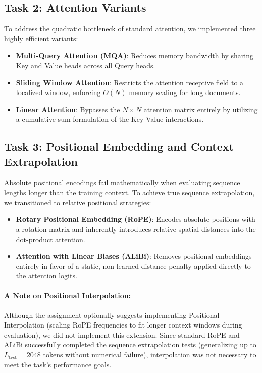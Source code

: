 \documentclass[11pt,a4paper]{article}
\begin{document}
\subsection{Task 2: Attention Variants}
To address the quadratic bottleneck of standard attention, we implemented three highly efficient variants:
\begin{itemize}
    \item \textbf{Multi-Query Attention (MQA)}: Reduces memory bandwidth by sharing Key and Value heads across all Query heads.
    \item \textbf{Sliding Window Attention}: Restricts the attention receptive field to a localized window, enforcing $O(N)$ memory scaling for long documents.
    \item \textbf{Linear Attention}: Bypasses the $N \times N$ attention matrix entirely by utilizing a cumulative-sum formulation of the Key-Value interactions.
\end{itemize}

\subsection{Task 3: Positional Embedding and Context Extrapolation}
Absolute positional encodings fail mathematically when evaluating sequence lengths longer than the training context. To achieve true sequence extrapolation, we transitioned to relative positional strategies:
\begin{itemize}
    \item \textbf{Rotary Positional Embedding (RoPE)}: Encodes absolute positions with a rotation matrix and inherently introduces relative spatial distances into the dot-product attention.
    \item \textbf{Attention with Linear Biases (ALiBi)}: Removes positional embeddings entirely in favor of a static, non-learned distance penalty applied directly to the attention logits.
\end{itemize}

\paragraph{A Note on Positional Interpolation:}
Although the assignment optionally suggests implementing Positional Interpolation (scaling RoPE frequencies to fit longer context windows during evaluation), we did not implement this extension. Since standard RoPE and ALiBi successfully completed the sequence extrapolation tests (generalizing up to $L_{\text{test}}=2048$ tokens without numerical failure), interpolation was not necessary to meet the task's performance goals.
\end{document}
